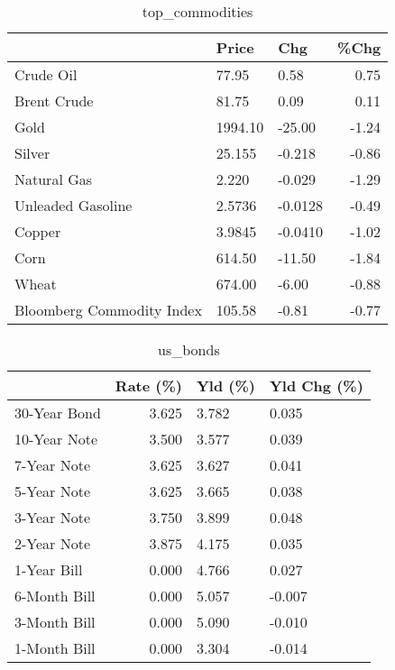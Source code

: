 \documentclass{article}%
\begin{document}
\begin{table}[htbp]%
\caption{top\_commodities}%
\centering%
\begin{adjustbox}{width=1\textwidth}%
\begin{tabular}{lllr}
\toprule
                          &   Price &     Chg &  \%Chg \\
\midrule
               Crude Oil  &   77.95 &    0.58 &  0.75 \\
             Brent Crude  &   81.75 &    0.09 &  0.11 \\
                    Gold  & 1994.10 &  -25.00 & -1.24 \\
                  Silver  &  25.155 &  -0.218 & -0.86 \\
             Natural Gas  &   2.220 &  -0.029 & -1.29 \\
       Unleaded Gasoline  &  2.5736 & -0.0128 & -0.49 \\
                  Copper  &  3.9845 & -0.0410 & -1.02 \\
                    Corn  &  614.50 &  -11.50 & -1.84 \\
                   Wheat  &  674.00 &   -6.00 & -0.88 \\
Bloomberg Commodity Index &  105.58 &   -0.81 & -0.77 \\
\bottomrule
\end{tabular}
%
\end{adjustbox}%
\end{table}

%


\begin{table}[htbp]%
\caption{us\_bonds}%
\centering%
\begin{adjustbox}{width=1\textwidth}%
\begin{tabular}{lrll}
\toprule
             &  Rate (\%) & Yld (\%) & Yld Chg (\%) \\
\midrule
30-Year Bond &     3.625 &   3.782 &       0.035 \\
10-Year Note &     3.500 &   3.577 &       0.039 \\
 7-Year Note &     3.625 &   3.627 &       0.041 \\
 5-Year Note &     3.625 &   3.665 &       0.038 \\
 3-Year Note &     3.750 &   3.899 &       0.048 \\
 2-Year Note &     3.875 &   4.175 &       0.035 \\
 1-Year Bill &     0.000 &   4.766 &       0.027 \\
6-Month Bill &     0.000 &   5.057 &      -0.007 \\
3-Month Bill &     0.000 &   5.090 &      -0.010 \\
1-Month Bill &     0.000 &   3.304 &      -0.014 \\
\bottomrule
\end{tabular}
%
\end{adjustbox}%
\end{table}
\end{document}
